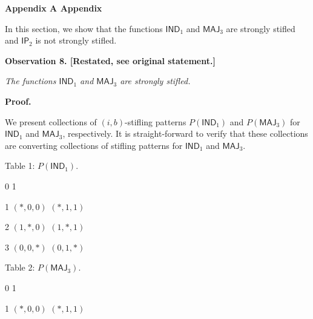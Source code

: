 \par\medskip\noindent\textbf{
Appendix A Appendix}\par




In this section, we show that the functions $\mathsf{IND}_{1}$ and $\mathsf{MAJ}_{3}$ are strongly stifled and $\mathsf{IP}_{2}$ is not strongly stifled.\par






\par\medskip\noindent\textbf{
\textbf{Observation 8}\textbf{.}
[Restated, see original statement.]}\par



\emph{The functions $\mathsf{IND}_{1}$ and $\mathsf{MAJ}_{3}$ are strongly stifled.}\par







\par\medskip\noindent\textbf{Proof.}\par




We present collections of $(i,b)$-stifling patterns $P(\mathsf{IND}_{1})$ and $P(\mathsf{MAJ}_{3})$ for $\mathsf{IND}_{1}$ and $\mathsf{MAJ}_{3}$, respectively.
It is straight-forward to verify that these collections are converting collections of stifling patterns for $\mathsf{IND}_{1}$ and $\mathsf{MAJ}_{3}$.\par






Table 1: $P(\mathsf{IND}_{1})$.




0
1




1
$(*,0,0)$
$(*,1,1)$


2
$(1,*,0)$
$(1,*,1)$


3
$(0,0,*)$
$(0,1,*)$







Table 2: $P(\mathsf{MAJ}_{3})$.




0
1




1
$(*,0,0)$
$(*,1,1)$


